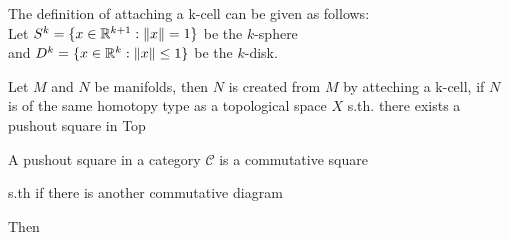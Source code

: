 \documentclass[a4paper,11pt]{article}
\begin{document}
The definition of attaching a k-cell can be given as follows: \\
Let $S^k = \{x \in {\mathbb R}^{k+1} : \lVert x \rVert = 1\}$ be the $k$-sphere \\
and $D^k = \{ x \in {\mathbb R}^k : \lVert x \rVert \leq 1 \}$ be the $k$-disk.

Let $M$ and $N$ be manifolds, then $N$ is created from $M$ by atteching a 
k-cell, if $N$ is of the same homotopy type as a topological space $X$ s.th. 
there exists a pushout square in Top

\begin{figure}[H]
   \centering
\end{figure}

A pushout square in a category $\mathcal{C}$ is a commutative square 

\begin{figure}[H]
   \centering
\end{figure}      
   
s.th if there is another commutative diagram

\begin{figure}[H]
   \centering
\end{figure}

Then 

\begin{figure}[H]
   \centering
\end{figure}
\end{document}
